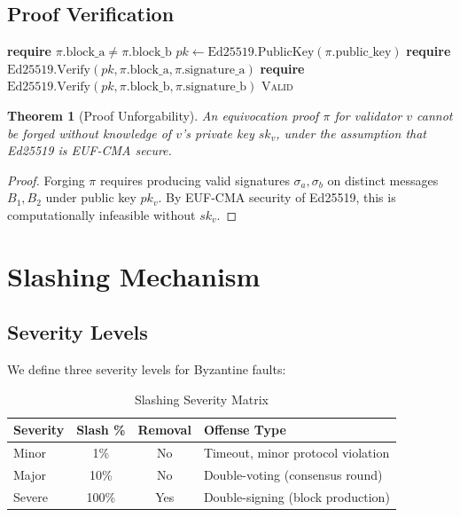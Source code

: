\documentclass[11pt,a4paper]{article}
\newtheorem{theorem}{Theorem}
\begin{document}
\subsection{Proof Verification}

\begin{algorithm}
\caption{Verify Equivocation Proof}
\begin{algorithmic}[1]
    \State \textbf{require} $\pi.\text{block\_a} \neq \pi.\text{block\_b}$
    \State $pk \gets \text{Ed25519.PublicKey}(\pi.\text{public\_key})$
    \State \textbf{require} $\text{Ed25519.Verify}(pk, \pi.\text{block\_a}, \pi.\text{signature\_a})$
    \State \textbf{require} $\text{Ed25519.Verify}(pk, \pi.\text{block\_b}, \pi.\text{signature\_b})$
    \State \Return \textsc{Valid}
\EndProcedure
\end{algorithmic}
\end{algorithm}

\begin{theorem}[Proof Unforgability]
An equivocation proof $\pi$ for validator $v$ cannot be forged without knowledge of $v$'s private key $sk_v$, under the assumption that Ed25519 is EUF-CMA secure.
\end{theorem}

\begin{proof}
Forging $\pi$ requires producing valid signatures $\sigma_a, \sigma_b$ on distinct messages $B_1, B_2$ under public key $pk_v$. By EUF-CMA security of Ed25519, this is computationally infeasible without $sk_v$.
\end{proof}

\section{Slashing Mechanism}

\subsection{Severity Levels}

We define three severity levels for Byzantine faults:

\begin{table}[h]
\centering
\begin{tabular}{|l|c|c|l|}
\hline
\textbf{Severity} & \textbf{Slash \%} & \textbf{Removal} & \textbf{Offense Type} \\
\hline
Minor & 1\% & No & Timeout, minor protocol violation \\
Major & 10\% & No & Double-voting (consensus round) \\
Severe & 100\% & Yes & Double-signing (block production) \\
\hline
\end{tabular}
\caption{Slashing Severity Matrix}
\end{table}
\end{document}
